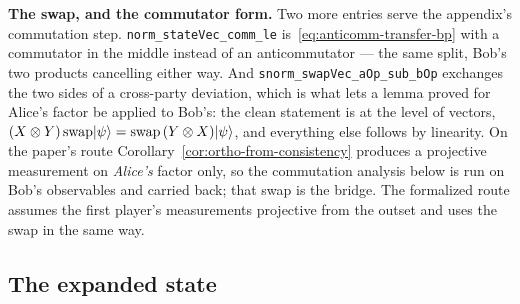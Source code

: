 \textbf{The swap, and the commutator form.} Two more entries serve the appendix's commutation
step. \texttt{norm\_stateVec\_comm\_le} is~\eqref{eq:anticomm-transfer-bp} with a commutator in the middle
instead of an anticommutator --- the same split, Bob's two products cancelling either way. And
\texttt{snorm\_swapVec\_aOp\_sub\_bOp} exchanges the two sides of a cross-party deviation, which is what lets
a lemma proved for Alice's factor be applied to Bob's: the clean statement is at the level of
vectors, $(X \otimes Y)\,\mathrm{swap}|\psi\rangle = \mathrm{swap}\,(Y \otimes X)|\psi\rangle$, and everything
else follows by linearity. On the paper's route Corollary~\ref{cor:ortho-from-consistency}
produces a projective measurement on \emph{Alice's} factor only, so the commutation analysis below
is run on Bob's observables and carried back; that swap is the bridge. The formalized route assumes
the first player's measurements projective from the outset and uses the swap in the same way.

\subsection{The expanded state}

